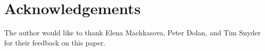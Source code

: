 \documentclass{sig-alternate}
\begin{document}
\section{Acknowledgements}
The author would like to thank Elena Machkasova, Peter Dolan, and Tim Snyder for their feedback on this paper.

  
\end{document}
